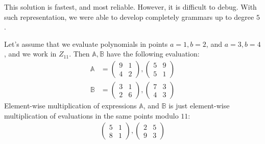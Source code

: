 This solution is fastest, and most reliable. However, it is difficult to debug. With such representation, we were able to
develop completely grammars up to degree $5$.


Let's assume that we evaluate polynomials in points $a = 1, b = 2$, and $a = 3, b = 4$, and we work in $Z_{11}$.
Then $\mathbb{A}, \mathbb{B}$ have the following evaluation:
\begin{align*}
\mathbb{A} &= \begin{pmatrix} 9 & 1\\ 4 & 2 \end{pmatrix}, \begin{pmatrix} 5 & 9\\ 5 & 1 \end{pmatrix} \\
\mathbb{B} &= \begin{pmatrix} 3 & 1\\ 2 & 6 \end{pmatrix}, \begin{pmatrix} 7 & 3\\ 4 & 3 \end{pmatrix}
\end{align*}
Element-wise multiplication of expressions $\mathbb{A}$, and $\mathbb{B}$ is just element-wise multiplication of evaluations
in the same points modulo $11$:
\begin{align*}
\begin{pmatrix} 5 & 1\\ 8 & 1 \end{pmatrix}, \begin{pmatrix} 2 & 5\\ 9 & 3 \end{pmatrix}
\end{align*}

